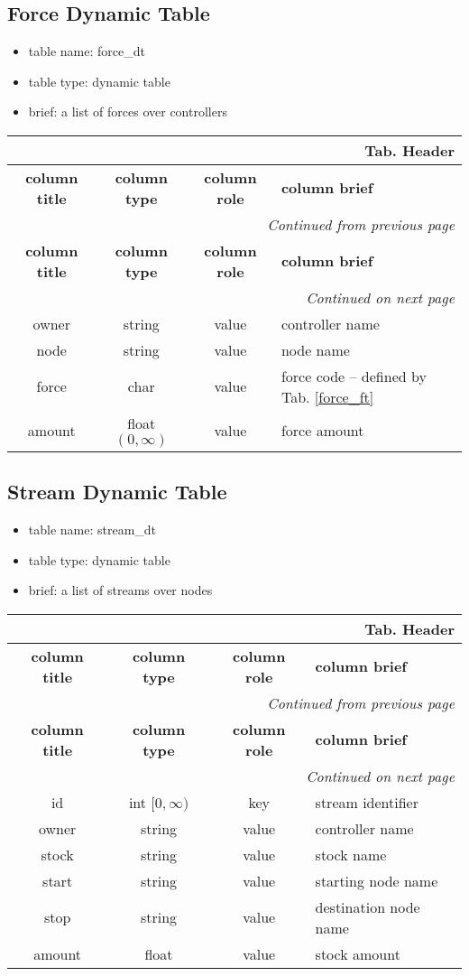 \documentclass[a4paper,oneside,titlepage]{report}
\newcommand*{\LTHeaderIV}[5]{
  \multicolumn{4}{r}{\textbf{Tab. \thesubsection} \textbf{#1}}\\    
  \hline
  \textbf{#2} & \textbf{#3} & \textbf{#4} & \textbf{#5}\\
  \hline
  
  \endfirsthead
  \multicolumn{4}{r}{\textit{Continued from previous page}}\\    
  \hline
  \textbf{#2} & \textbf{#3} & \textbf{#4} & \textbf{#5}\\
  \hline
  \endhead
  \hline
  \multicolumn{4}{r}{\textit{Continued on next page}}\\
  \endfoot
  \hline
  \endlastfoot  
}
\begin{document}
\subsection{Force Dynamic Table}
\begin{itemize}
  \setlength{\itemsep}{0pt}
  \setlength{\parskip}{0pt}
\item table name: force\_dt  
\item table type: dynamic table   
\item brief: a list of forces over controllers
\end{itemize}

\vspace{-0.5cm}
\begin{longtable}{ |c|c|c|l| } 
  \LTHeaderIV{Header}{column title}{column type}{column role}{column brief}                    
  owner & string & value & controller name\\
  node & string & value & node name\\
  force & char & value & force code -- defined by Tab. \ref{force_ft}\\
  amount & float $(0, \infty)$ & value & force amount\\
\end{longtable}        


\subsection{Stream Dynamic Table}
\begin{itemize}
  \setlength{\itemsep}{0pt}
  \setlength{\parskip}{0pt}
\item table name: stream\_dt  
\item table type: dynamic table   
\item brief: a list of streams over nodes
\end{itemize}

\vspace{-0.5cm}
\begin{longtable}{ |c|c|c|l| } 
  \LTHeaderIV{Header}{column title}{column type}{column role}{column brief}                    
  id & int $[0, \infty)$ & key & stream identifier\\
  owner & string & value & controller name\\
  stock & string & value & stock name\\
  start & string & value & starting node name\\
  stop & string & value & destination node name\\
  amount & float & value & stock amount \\
\end{longtable}        
\end{document}
